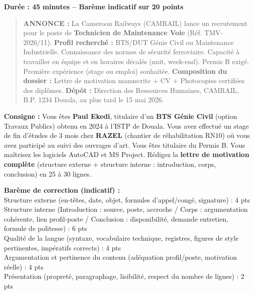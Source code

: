 \documentclass[11pt]{article}
\newcounter{popsec}
\newcounter{popsub}
\newcommand{\courssub}[1]{%
  \stepcounter{popsub}%
  \par\vspace{9pt}\noindent{\popxbold\fontsize{11.5}{13}\selectfont\color{popink}{\color{poporange}\thepopsec.\thepopsub}\hspace{6pt}#1}\par\nopagebreak\vspace{4pt}
}
\begin{document}
\courssub{Je me prépare au Bac}

\begin{exercice}
\textbf{Durée : 45 minutes -- Barème indicatif sur 20 points}
\begin{quote}
\textbf{ANNONCE :} La Cameroon Railways (CAMRAIL) lance un recrutement pour le poste de \textbf{Technicien de Maintenance Voie} (Réf. TMV-2026/11).
\textbf{Profil recherché :} BTS/DUT Génie Civil ou Maintenance Industrielle. Connaissance des normes de sécurité ferroviaire. Capacité à travailler en équipe et en horaires décalés (nuit, week-end). Permis B exigé. Première expérience (stage ou emploi) souhaitée.
\textbf{Composition du dossier :} Lettre de motivation manuscrite + CV + Photocopies certifiées des diplômes.
\textbf{Dépôt :} Direction des Ressources Humaines, CAMRAIL, B.P. 1234 Douala, au plus tard le 15 mai 2026.
\end{quote}
\textbf{Consigne :} Vous êtes \textbf{Paul Ekedi}, titulaire d'un \textbf{BTS Génie Civil} (option Travaux Publics) obtenu en 2024 à l'ISTP de Douala. Vous avez effectué un stage de fin d'études de 3 mois chez \textbf{RAZEL} (chantier de réhabilitation RN10) où vous avez participé au suivi des ouvrages d'art. Vous êtes titulaire du Permis B. Vous maîtrisez les logiciels AutoCAD et MS Project.
Rédigez la \textbf{lettre de motivation complète} (structure externe + structure interne : introduction, corps, conclusion) en 25 à 30 lignes.
\begin{center}
\textbf{Barème de correction (indicatif) :} \\
Structure externe (en-têtes, date, objet, formules d'appel/congé, signature) : 4 pts \\
Structure interne (Introduction : source, poste, accroche / Corps : argumentation cohérente, lien profil-poste / Conclusion : disponibilité, demande entretien, formule de politesse) : 6 pts \\
Qualité de la langue (syntaxe, vocabulaire technique, registres, figures de style pertinentes, impératifs corrects) : 4 pts \\
Argumentation et pertinence du contenu (adéquation profil/poste, motivation réelle) : 4 pts \\
Présentation (propreté, paragraphage, lisibilité, respect du nombre de lignes) : 2 pts
\end{center}
\end{exercice}
\end{document}
